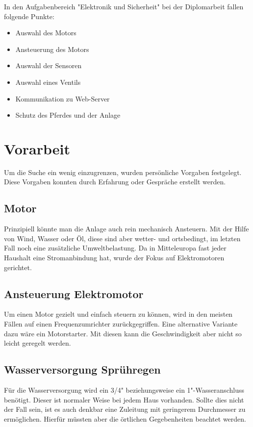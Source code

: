 In den Aufgabenbereich "{}Elektronik und Sicherheit"{} bei der Diplomarbeit fallen folgende Punkte:

\begin{itemize}
\item Auswahl des Motors
\item Ansteuerung des Motors
\item Auswahl der Sensoren
\item Auswahl eines Ventils
\item Kommunikation zu Web-Server
\item Schutz des Pferdes und der Anlage
\end{itemize}
\newpage
\section{Vorarbeit}
\label{sec:vorarbeit}

Um die Suche ein wenig einzugrenzen, wurden persönliche Vorgaben festgelegt.
Diese Vorgaben konnten durch Erfahrung oder Gespräche erstellt werden.

\subsection{Motor}
\label{sec:motor}

Prinzipiell könnte man die Anlage auch rein mechanisch Ansteuern. Mit der Hilfe von Wind, Wasser oder Öl, diese sind aber wetter- und ortsbedingt, im letzten Fall noch eine zusätzliche Umweltbelastung. Da in Mitteleuropa fast jeder Haushalt eine Stromanbindung hat, wurde der Fokus auf Elektromotoren gerichtet.

\subsection{Ansteuerung Elektromotor}
\label{sec:ansteuerungElektromotor}

Um einen Motor gezielt und einfach steuern zu können, wird in den meisten Fällen auf einen Frequenzumrichter zurückgegriffen. Eine alternative Variante dazu wäre ein Motorstarter. Mit diesen kann die Geschwindigkeit aber nicht so leicht geregelt werden. 

\subsection{Wasserversorgung Sprühregen}
\label{sec:wasserversorgungSpruehregen}

Für die Wasserversorgung wird ein 3/4"{} beziehungsweise ein 1"{}-Wasseranschluss benötigt. Dieser ist normaler Weise bei jedem Haus vorhanden. 
Sollte dies nicht der Fall sein, ist es auch denkbar eine Zuleitung mit geringerem Durchmesser zu ermöglichen. Hierfür müssten aber die örtlichen Gegebenheiten beachtet werden.

